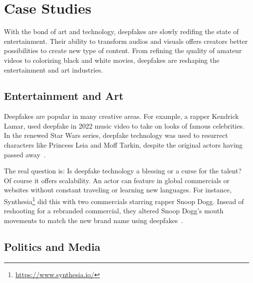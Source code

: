 
\chapter{Case Studies}\label{chapter:applications}
With the bond of art and technology, deepfakes are slowly redifing the state of 
entertainment. Their ability to transform audios and visuals offers creators better
possibilities to create new type of content. From refining the quality of amateur
videos to colorizing black and white movies, deepfakes are reshaping the entertainment
and art industries. 


\section{Entertainment and Art}
Deepfakes are popular in many creative areas. For example, a rapper Kendrick Lamar,
used deepfake in 2022 music video to take on looks of famous celebrities. In the 
renewed Star Wars series, deepfake technology was used to resurrect characters like
Princess Leia and Moff Tarkin, despite the original actors having passed away~\cite{motion-analysis}. 

The real question is: Is deepfake technology a blessing or a curse for the talent?
Of course it offers scalability. An actor can feature in global commercials or websites
without constant traveling or learning new languages. For instance, Synthesia\footnote{\url{https://www.synthesia.io/}}
did this with two commercials starring rapper Snoop Dogg. Insead of reshooting for a
rebranded commercial, they altered Snoop Dogg's mouth movements to match the new brand 
name using deepfakes~\cite{wipo-magazine}.

\section{Politics and Media}